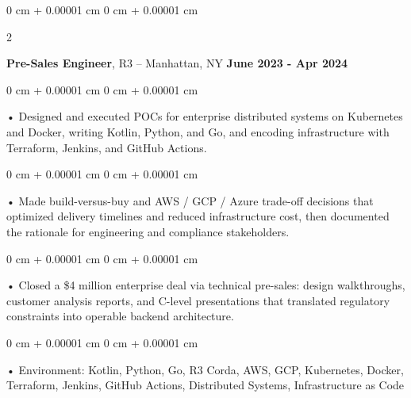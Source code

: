 \documentclass[10pt, letterpaper]{article}
\newenvironment{onecolentry}{
    \begin{adjustwidth}{
        0 cm + 0.00001 cm
    }{
        0 cm + 0.00001 cm
    }
}{
    \end{adjustwidth}
} %
\newenvironment{twocolentry}[2][]{
    \onecolentry
    \def\secondColumn{#2}
    \setcolumnwidth{\fill, 4.5 cm}
    \begin{paracol}{2}
}{
    \switchcolumn \raggedleft \secondColumn
    \end{paracol}
    \endonecolentry
} %
\begin{document}
        \begin{twocolentry}{
            \textbf{June 2023 - Apr 2024}
        }
            \textbf{Pre-Sales Engineer}, R3 -- Manhattan, NY\end{twocolentry}


        \begin{onecolentry}
             • Designed and executed POCs for enterprise distributed systems on Kubernetes and Docker, writing Kotlin, Python, and Go, and encoding infrastructure with Terraform, Jenkins, and GitHub Actions.
        \end{onecolentry}
        \begin{onecolentry}
             • Made build-versus-buy and AWS / GCP / Azure trade-off decisions that optimized delivery timelines and reduced infrastructure cost, then documented the rationale for engineering and compliance stakeholders.
        \end{onecolentry}
        \begin{onecolentry}
             • Closed a \$4 million enterprise deal via technical pre-sales: design walkthroughs, customer analysis reports, and C-level presentations that translated regulatory constraints into operable backend architecture.
        \end{onecolentry}
        \begin{onecolentry}
             • Environment: Kotlin, Python, Go, R3 Corda, AWS, GCP, Kubernetes, Docker, Terraform, Jenkins, GitHub Actions, Distributed Systems, Infrastructure as Code
        \end{onecolentry}
        \vspace{0.1cm}
\end{document}
